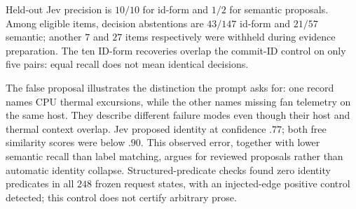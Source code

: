 Held-out Jev precision is $10/10$ for id-form and $1/2$ for semantic proposals.
Among eligible items, decision abstentions are $43/147$ id-form and $21/57$
semantic; another $7$ and $27$ items respectively were withheld during evidence
preparation. The ten ID-form recoveries overlap the commit-ID control on only
five pairs: equal recall does not mean identical decisions.

The false proposal illustrates the distinction the prompt asks for: one record
names CPU thermal excursions, while the other names missing fan telemetry on
the same host. They describe different failure modes even though their host and
thermal context overlap. Jev proposed identity at confidence $.77$; both free
similarity scores were below $.90$. This observed error, together with lower
semantic recall than label matching, argues for reviewed proposals rather than
automatic identity collapse. Structured-predicate checks found zero identity
predicates in all $248$ frozen request states, with an injected-edge positive
control detected; this control does not certify arbitrary prose.
